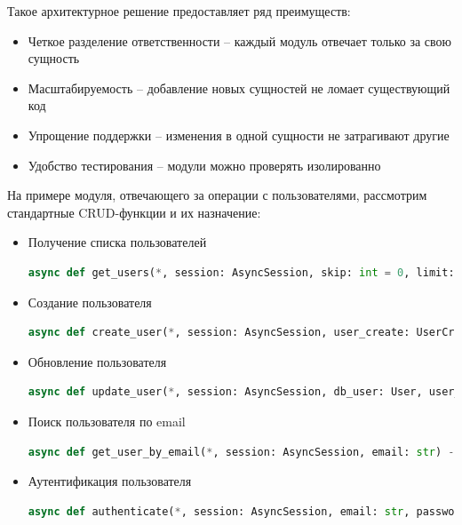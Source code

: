 Такое архитектурное решение предоставляет ряд преимуществ:
\begin{itemize}
    \item Четкое разделение ответственности – каждый модуль отвечает только за свою сущность
    \item Масштабируемость – добавление новых сущностей не ломает существующий код
    \item Упрощение поддержки – изменения в одной сущности не затрагивают другие
    \item Удобство тестирования – модули можно проверять изолированно
\end{itemize}


На примере модуля, отвечающего за операции с пользователями, рассмотрим стандартные CRUD-функции и их назначение:

\begin{itemize}
    \item Получение списка пользователей
    \begin{lstlisting}[language=Python, numbers=none, frame=none]
    async def get_users(*, session: AsyncSession, skip: int = 0, limit: int = 100) -> list[User]:
    \end{lstlisting}
    
    \item Создание пользователя
    \begin{lstlisting}[language=Python, numbers=none, frame=none]
    async def create_user(*, session: AsyncSession, user_create: UserCreate) -> User:
    \end{lstlisting}

    \item Обновление пользователя
    \begin{lstlisting}[language=Python, numbers=none, frame=none]
    async def update_user(*, session: AsyncSession, db_user: User, user_in: UserUpdate) -> Any:
    \end{lstlisting}

    \item Поиск пользователя по email
    \begin{lstlisting}[language=Python, numbers=none, frame=none]
    async def get_user_by_email(*, session: AsyncSession, email: str) -> User | None:
    \end{lstlisting}

    \item Аутентификация пользователя
    \begin{lstlisting}[language=Python, numbers=none, frame=none]
    async def authenticate(*, session: AsyncSession, email: str, password: str) -> User | None:
    \end{lstlisting}
\end{itemize}

